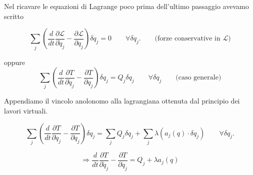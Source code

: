 Nel ricavare le equazioni di Lagrange poco prima dell'ultimo
passaggio avevamo scritto

\[
\sum_j
\left(
\frac{d}{dt}\frac{\partial \mathcal{L}}{\partial \dot{q}_j}
-
\frac{\partial \mathcal{L}}{\partial q_j}
\right)
\delta q_j = 0
\qquad \forall \delta q_j. \qquad \text{(forze conservative in } \mathcal{L}\text{)}
\]


oppure
\[
\sum_j
\left(
\frac{d}{dt}\frac{\partial T}{\partial \dot{q}_j}
-
\frac{\partial T}{\partial q_j}
\right)
\delta q_j
=
Q_j \delta q_j
\qquad \forall \delta q_j
\qquad \text{(caso generale)}
\]

Appendiamo il vincolo anolonomo alla lagrangiana ottenuta
dal principio dei lavori virtuali.

\[
\sum_j
\left(
\frac{d}{dt}\frac{\partial T}{\partial \dot{q}_j}
-
\frac{\partial T}{\partial q_j}
\right)
\delta q_j
=
\sum_j Q_j \delta q_j
+
\sum_j \lambda
\left(
a_j(q) \cdot \delta q_j
\right)
\qquad \forall \delta q_j.
\]

\[
\Rightarrow
\frac{d}{dt}\frac{\partial T}{\partial \dot{q}_j}
-
\frac{\partial T}{\partial q_j}
=
Q_j + \lambda a_j(q)
\]

